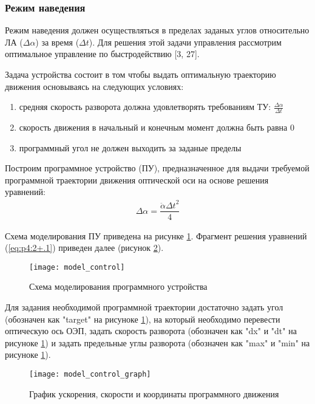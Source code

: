 \subsubsection{Режим наведения} \label{subsec:ch4/sect2/sub1}

Режим наведения должен осуществляться в пределах заданых углов относительно ЛА ($\varDelta\alpha$) за время ($\varDelta t$). Для решения этой задачи управления рассмотрим оптимальное управление по быстродействию [3, 27].

Задача устройства состоит в том чтобы выдать оптимальную траекторию движения основываясь на следующих условиях:
\begin{enumerate}
	\item средняя скорость разворота должна удовлетворять требованиям ТУ: 
	$\frac{\varDelta\alpha}{\varDelta t}$
	\item скорость движения в начальный и конечным момент должна быть равна 0
	\item программный угол не должен выходить за заданые пределы
\end{enumerate}

Построим программное устройство (ПУ), предназначенное для выдачи требуемой программной траектории движения оптической оси на основе решения уравнений:
\begin{equation}
\label{eq:p4:2+.1}
\begin{alignedat}{2}
\varDelta\alpha = \dfrac{\ddot{\alpha}{\varDelta t}^2}{4}
\end{alignedat}
\end{equation}

Схема моделирования ПУ приведена на рисунке \ref{fig:model_control}. Фрагмент решения уравнений (\ref{eq:p4:2+.1}) приведен далее (рисунок \ref{fig:model_control_graph}).

\begin{figure}[ht]
	\centering
	\texttt{[image: model\_control]} 
	\caption{Схема моделирования программного устройства}
	\label{fig:model_control}
\end{figure}

Для задания необходимой программной траектории достаточно задать угол (обозначен как "target" на рисуноке \ref{fig:model_control}), на который  необходимо перевести оптическую ось ОЭП, задать скорость разворота (обозначен как "dx" и "dt" на рисуноке \ref{fig:model_control}) и задать предельные углы разворота (обозначен как "max" и "min" на рисуноке \ref{fig:model_control}). 

\begin{figure}
	\centering
	\texttt{[image: model\_control\_graph]}
	\caption{График ускорения, скорости и координаты программного движения}
	\label{fig:model_control_graph}
\end{figure}

